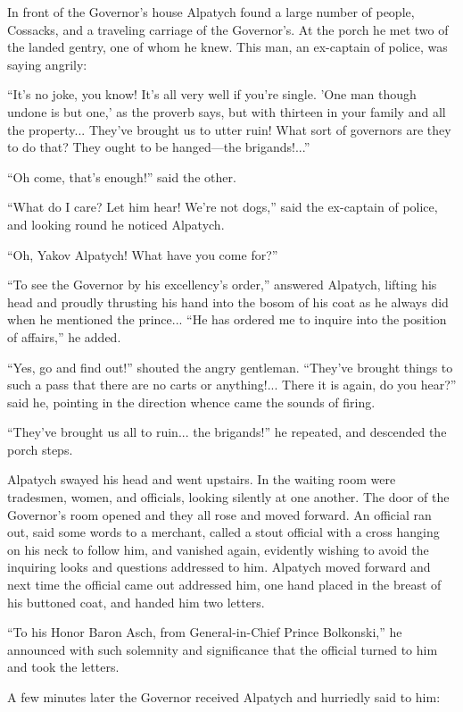 In front of the Governor's house Alpatych found a large number of
people, Cossacks, and a traveling carriage of the Governor's. At
the porch he met two of the landed gentry, one of whom he
knew. This man, an ex-captain of police, was saying angrily:

``It's no joke, you know! It's all very well if you're
single. 'One man though undone is but one,' as the proverb says,
but with thirteen in your family and all the property... They've
brought us to utter ruin!  What sort of governors are they to do
that? They ought to be hanged---the brigands!...''

``Oh come, that's enough!'' said the other.

``What do I care? Let him hear! We're not dogs,'' said the
ex-captain of police, and looking round he noticed Alpatych.

``Oh, Yakov Alpatych! What have you come for?''

``To see the Governor by his excellency's order,'' answered
Alpatych, lifting his head and proudly thrusting his hand into
the bosom of his coat as he always did when he mentioned the
prince... ``He has ordered me to inquire into the position of
affairs,'' he added.

``Yes, go and find out!'' shouted the angry gentleman. ``They've
brought things to such a pass that there are no carts or
anything!... There it is again, do you hear?'' said he, pointing
in the direction whence came the sounds of firing.

``They've brought us all to ruin... the brigands!'' he repeated,
and descended the porch steps.

Alpatych swayed his head and went upstairs. In the waiting room
were tradesmen, women, and officials, looking silently at one
another. The door of the Governor's room opened and they all rose
and moved forward.  An official ran out, said some words to a
merchant, called a stout official with a cross hanging on his
neck to follow him, and vanished again, evidently wishing to
avoid the inquiring looks and questions addressed to
him. Alpatych moved forward and next time the official came out
addressed him, one hand placed in the breast of his buttoned
coat, and handed him two letters.

``To his Honor Baron Asch, from General-in-Chief Prince
Bolkonski,'' he announced with such solemnity and significance
that the official turned to him and took the letters.

A few minutes later the Governor received Alpatych and hurriedly
said to him:

